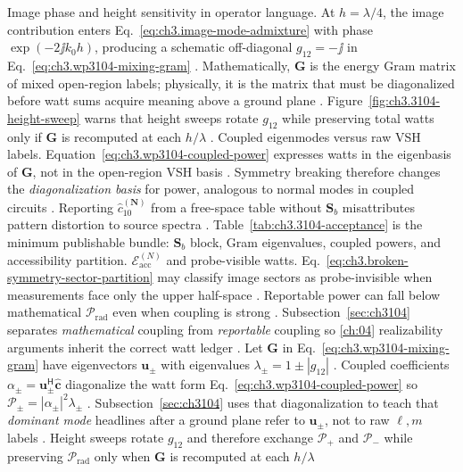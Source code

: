 Image phase and height sensitivity in operator language. At \(h=\lambda/4\), the image contribution enters Eq.~\eqref{eq:ch3.image-mode-admixture} with phase \(\exp(-2\jj k_{0}h)\), producing a
schematic off-diagonal \(g_{12}=-\jj\) in Eq.~\eqref{eq:ch3.wp3104-mixing-gram} \cite{jackson1999}. Mathematically, \(\mathbf{G}\) is
the energy Gram matrix of mixed open-region labels; physically, it is the matrix that must be diagonalized before watt sums acquire meaning above
a ground plane \cite{harrington2001}. Figure~\ref{fig:ch3.3104-height-sweep} warns that height sweeps rotate \(g_{12}\) while
preserving total watts only if \(\mathbf{G}\) is recomputed at each \(h/\lambda\) \cite{harrington2001}.
Coupled eigenmodes versus raw VSH labels. Equation~\eqref{eq:ch3.wp3104-coupled-power} expresses watts in the eigenbasis of \(\mathbf{G}\), not in the open-region VSH basis
\cite{hansen1988}. Symmetry breaking therefore changes the \emph{diagonalization basis} for power, analogous to normal modes in
coupled circuits \cite{harrington2001}. Reporting \(\widehat{c}_{10}^{(\mathbf{N})}\) from a free-space table without \(\mathbf{S}_{b}\)
misattributes pattern distortion to source spectra \cite{jackson1999}. Table~\ref{tab:ch3.3104-acceptance} is the minimum publishable
bundle: \(\mathbf{S}_{b}\) block, Gram eigenvalues, coupled powers, and accessibility partition.
$\mathcal{E}_{\mathrm{acc}}^{(N)}$ and probe-visible watts. Eq.~\eqref{eq:ch3.broken-symmetry-sector-partition} may classify image sectors as probe-invisible when measurements face only the upper half-space
\cite{harrington2001}. Reportable power can fall below mathematical \(\mathcal{P}_{\mathrm{rad}}\) even when coupling is strong
\cite{hansen1988}. Subsection~\ref{sec:ch3104} separates \emph{mathematical} coupling from \emph{reportable} coupling so
\ref{ch:04} realizability arguments inherit the correct watt ledger \cite{devaney2004}.
Let \(\mathbf{G}\) in Eq.~\eqref{eq:ch3.wp3104-mixing-gram} have eigenvectors \(\mathbf{u}_{\pm}\) with eigenvalues \(\lambda_{\pm}=1\pm|g_{12}|\)
\cite{hansen1988}. Coupled coefficients \(\alpha_{\pm}=\mathbf{u}_{\pm}^{\mathsf{H}}\widehat{\mathbf{c}}\) diagonalize the watt form
Eq.~\eqref{eq:ch3.wp3104-coupled-power} so \(\mathcal{P}_{\pm}=|\alpha_{\pm}|^{2}\lambda_{\pm}\) \cite{poynting1884}. Subsection~\ref{sec:ch3104} uses that diagonalization to teach that \emph{dominant mode} headlines after a ground plane refer to \(\mathbf{u}_{\pm}\), not to raw \(\ell,m\) labels
\cite{harrington2001}. Height sweeps rotate \(g_{12}\) and therefore exchange \(\mathcal{P}_{+}\) and \(\mathcal{P}_{-}\) while preserving \(\mathcal{P}_{\mathrm{rad}}\) only when \(\mathbf{G}\) is recomputed at each \(h/\lambda\)
